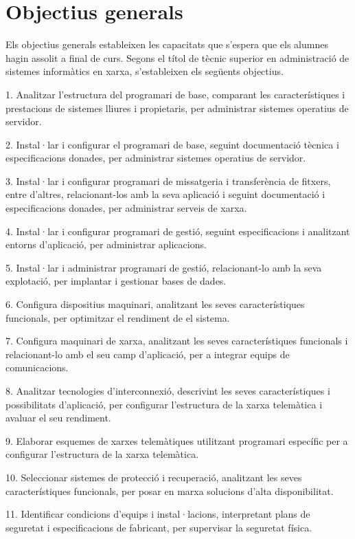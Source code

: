 \documentclass[catalan, a4paper, 12pt, titlepage]{article}
\begin{document}
\section{Objectius generals}

Els objectius generals estableixen les capacitats que s'espera que els alumnes hagin assolit a final de curs. Segons el títol de tècnic superior en administració de sistemes informàtics en xarxa, s'estableixen els següents objectius.

1. Analitzar l'estructura del programari de base, comparant les característiques i prestacions de sistemes lliures i propietaris, per administrar sistemes operatius de servidor.

2. Instal·lar i configurar el programari de base, seguint documentació tècnica i especificacions donades, per administrar sistemes operatius de servidor.

3. Instal·lar i configurar programari de missatgeria i transferència de fitxers, entre d'altres, relacionant-los amb la seva aplicació i seguint documentació i especificacions donades, per administrar serveis de xarxa.

4. Instal·lar i configurar programari de gestió, seguint especificacions i analitzant entorns d'aplicació, per administrar aplicacions.

5. Instal·lar i administrar programari de gestió, relacionant-lo amb la seva explotació, per implantar i gestionar bases de dades.

6. Configura dispositius maquinari, analitzant les seves característiques funcionals, per optimitzar el rendiment de el sistema.

7. Configura maquinari de xarxa, analitzant les seves característiques funcionals i relacionant-lo amb el seu camp d'aplicació, per a integrar equips de comunicacions.

8. Analitzar tecnologies d'interconnexió, descrivint les seves característiques i possibilitats d'aplicació, per configurar l'estructura de la xarxa telemàtica i avaluar el seu rendiment.

9. Elaborar esquemes de xarxes telemàtiques utilitzant programari específic per a configurar l'estructura de la xarxa telemàtica.

10. Seleccionar sistemes de protecció i recuperació, analitzant les seves característiques funcionals, per posar en marxa solucions d'alta disponibilitat.

11. Identificar condicions d'equips i instal·lacions, interpretant plans de seguretat i especificacions de fabricant, per supervisar la seguretat física.
\end{document}
